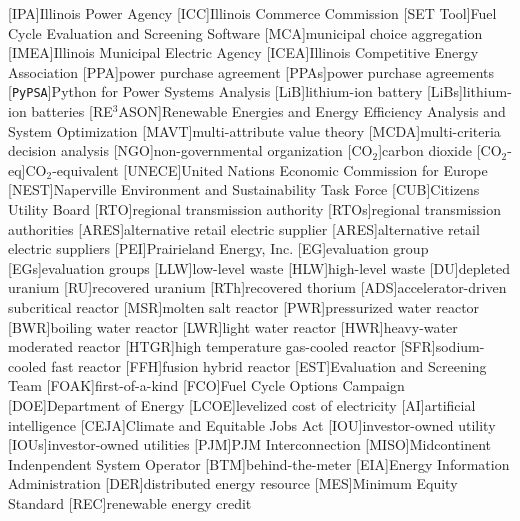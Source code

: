 [IPA]{Illinois Power Agency}
[ICC]{Illinois Commerce Commission}
[SET Tool]{Fuel Cycle Evaluation and Screening Software}
[MCA]{municipal choice aggregation}
[IMEA]{Illinois Municipal Electric Agency}
[ICEA]{Illinois Competitive Energy Association}
[PPA]{power purchase agreement}
[PPAs]{power purchase agreements}
[\texttt{PyPSA}]{Python for Power Systems Analysis}
[LiB]{lithium-ion battery}
[LiBs]{lithium-ion batteries}
[RE$^3$ASON]{Renewable Energies and Energy Efficiency Analysis and System Optimization}
[MAVT]{multi-attribute value theory}
[MCDA]{multi-criteria decision analysis}
[NGO]{non-governmental organization}
[CO$_2$]{carbon dioxide}
[CO$_2$-eq]{CO$_2$-equivalent}
[UNECE]{United Nations Economic Commission for Europe}
[NEST]{Naperville Environment and Sustainability Task Force}
[CUB]{Citizens Utility Board}
[RTO]{regional transmission authority}
[RTOs]{regional transmission authorities}
[ARES]{alternative retail electric supplier}
[ARES]{alternative retail electric suppliers}
[PEI]{Prairieland Energy, Inc.}
[EG]{evaluation group}
[EGs]{evaluation groups}
[LLW]{low-level waste}
[HLW]{high-level waste}
[DU]{depleted uranium}
[RU]{recovered uranium}
[RTh]{recovered thorium}
[ADS]{accelerator-driven subcritical reactor}
[MSR]{molten salt reactor}
[PWR]{pressurized water reactor}
[BWR]{boiling water reactor}
[LWR]{light water reactor}
[HWR]{heavy-water moderated reactor}
[HTGR]{high temperature gas-cooled reactor}
[SFR]{sodium-cooled fast reactor}
[FFH]{fusion hybrid reactor}
[EST]{Evaluation and Screening Team}
[FOAK]{first-of-a-kind}
[FCO]{Fuel Cycle Options Campaign}
[DOE]{Department of Energy}
[LCOE]{levelized cost of electricity}
[AI]{artificial intelligence}
[CEJA]{Climate and Equitable Jobs Act}
[IOU]{investor-owned utility}
[IOUs]{investor-owned utilities}
[PJM]{PJM Interconnection}
[MISO]{Midcontinent Indenpendent System Operator}
[BTM]{behind-the-meter}
[EIA]{Energy Information Administration}
[DER]{distributed energy resource}
[MES]{Minimum Equity Standard}
[REC]{renewable energy credit}


